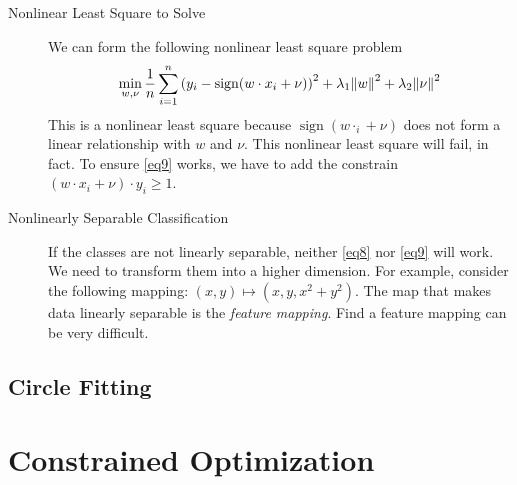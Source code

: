 \begin{description}
\begin{prf}
	\end{prf}
	\item[Nonlinear Least Square to Solve] We can form the following nonlinear least square problem \begin{equation}\label{eq9}\min_{w,\nu}\dfrac{1}{n}\sum_{i=1}^n\qty(y_i-\operatorname{sign}(w\cdot x_i+\nu))^2+\lambda_1\norm{w}^2+\lambda_2\norm{\nu}^2\end{equation} This is a nonlinear least square because $\operatorname{sign}(w\cdot _i+\nu)$ does not form a linear relationship with $w$ and $\nu$. This nonlinear least square will fail, in fact. To ensure \eqref{eq9} works, we have to add the constrain $(w\cdot x_i+\nu)\cdot y_i\geq1$.
	\item[Nonlinearly Separable Classification] If the classes are not linearly separable, neither \eqref{eq8} nor \eqref{eq9} will work. We need to transform them into a higher dimension. For example, consider the following mapping: $(x,y)\mapsto(x,y,x^2+y^2)$. The map that makes data linearly separable is the \textit{feature mapping}. Find a feature mapping can be very difficult. 
\end{description}

\subsection{Circle Fitting}

\newpage
\section{Constrained Optimization}

